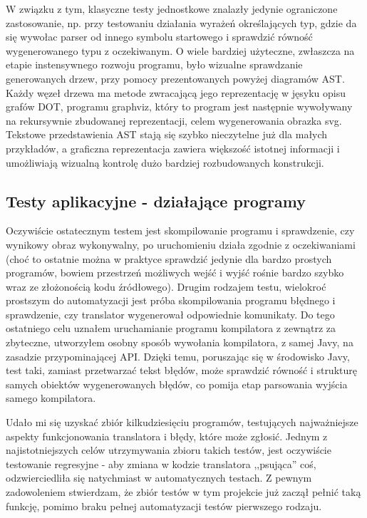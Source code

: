 W związku z tym, klasyczne testy jednostkowe znalazły jedynie ograniczone zastosowanie, np. przy testowaniu działania wyrażeń określających typ, gdzie da się wywołac parser od innego symbolu startowego i sprawdzić równość wygenerowanego typu z oczekiwanym. O wiele bardziej użyteczne, zwłaszcza na etapie instensywnego rozwoju programu, było wizualne sprawdzanie generowanych drzew, przy pomocy prezentowanych powyżej diagramów AST. Każdy węzeł drzewa ma metode zwracającą jego reprezentację w jęsyku opisu grafów DOT, programu graphviz, który to program jest następnie wywoływany na rekursywnie zbudowanej reprezentacji, celem wygenerowania obrazka svg. Tekstowe przedstawienia AST stają się szybko nieczytelne już dla małych przykładów, a graficzna reprezentacja zawiera większość istotnej informacji i umożliwiają wizualną kontrolę dużo bardziej rozbudowanych konstrukcji.

\subsection{Testy aplikacyjne - działające programy}
Oczywiście ostatecznym testem jest skompilowanie programu i sprawdzenie, czy wynikowy obraz wykonywalny, po uruchomieniu działa zgodnie z oczekiwaniami (choć to ostatnie można w praktyce sprawdzić jedynie dla bardzo prostych programów, bowiem przestrzeń możliwych wejść i wyjść rośnie bardzo szybko wraz ze złożonością kodu źródłowego). Drugim rodzajem testu, wielokroć prostszym do automatyzacji jest próba skompilowania programu błędnego i sprawdzenie, czy translator wygenerował odpowiednie komunikaty.
Do tego ostatniego celu uznałem uruchamianie programu kompilatora z zewnątrz za zbyteczne, utworzyłem osobny sposób wywołania kompilatora, z samej Javy, na zasadzie przypominającej API. Dzięki temu, poruszając się w środowisko Javy, test taki, zamiast przetwarzać tekst błędów, może sprawdzić równość i strukturę samych obiektów wygenerowanych błędów, co pomija etap parsowania wyjścia samego kompilatora.

Udało mi się uzyskać zbiór kilkudziesięciu programów, testujących najważniejsze aspekty funkcjonowania translatora i błędy, które może zgłosić. Jednym z najistotniejszych celów utrzymywania zbioru takich testów, jest oczywiście testowanie regresyjne - aby zmiana w kodzie translatora ,,psująca'' coś, odzwierciedliła się natychmiast w automatycznych testach. Z pewnym zadowoleniem stwierdzam, że zbiór testów w tym projekcie już zaczął pełnić taką funkcję, pomimo braku pełnej automatyzacji testów pierwszego rodzaju.

